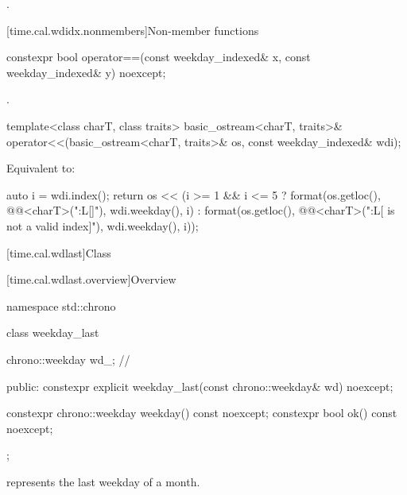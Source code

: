 \begin{itemdescr}
\pnum
\returns
{}.
\end{itemdescr}

[time.cal.wdidx.nonmembers]{Non-member functions}

%
\begin{itemdecl}
constexpr bool operator==(const weekday_indexed& x, const weekday_indexed& y) noexcept;
\end{itemdecl}

\begin{itemdescr}
\pnum
\returns
{}.
\end{itemdescr}

%
\begin{itemdecl}
template<class charT, class traits>
  basic_ostream<charT, traits>&
    operator<<(basic_ostream<charT, traits>& os, const weekday_indexed& wdi);
\end{itemdecl}

\begin{itemdescr}
\pnum
\effects
Equivalent to:
\begin{codeblock}
auto i = wdi.index();
return os << (i >= 1 && i <= 5 ?
  format(os.getloc(), @@<charT>("{:L}[{}]"), wdi.weekday(), i) :
  format(os.getloc(), @@<charT>("{:L}[{} is not a valid index]"),
         wdi.weekday(), i));
\end{codeblock}
\end{itemdescr}

[time.cal.wdlast]{Class }

[time.cal.wdlast.overview]{Overview}

\begin{codeblock}
namespace std::chrono {
  class weekday_last {
    chrono::weekday wd_;                // \expos

    public:
    constexpr explicit weekday_last(const chrono::weekday& wd) noexcept;

    constexpr chrono::weekday weekday() const noexcept;
    constexpr bool ok() const noexcept;
  };
}
\end{codeblock}

\pnum
{} represents the last weekday of a month.

